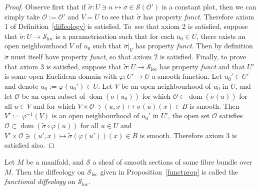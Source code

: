 \documentclass[10pt,a4paper]{amsart}
\numberwithin{equation}{section}
\def\loc{\operatorname{loc}}
\def\dom{\operatorname{dom}}
\def\OO{{\mathcal{O}}}
\def\SS{{\mathscr{S}}}
\begin{document}
\begin{proof}
Observe first that if $\tilde{\sigma}\colon U\ni u\mapsto \sigma\in \SS(\mathcal{O}')$ is a constant plot, then we can simply take $\OO:=\OO'$ and $V = U$ to see that $\tilde{\sigma}$ has property \textit{funct}. Therefore axiom 1 of Definition~\ref{diffeology} is satisfied. To~see that axiom 2 is satisfied, suppose that $\tilde{\sigma}\colon U\rightarrow\SS_{\loc}$ is a parametrisation such that for each $u_{0}\in U$, there exists an open neighbourhood $V$ of $u_{0}$ such that $\tilde{\sigma}|_{V}$ has property \textit{funct}. Then by definition $\tilde{\sigma}$ must itself have property \textit{funct}, so that axiom 2 is satisfied. Finally, to prove that axiom 3 is satisfied, suppose that $\tilde{\sigma}\colon U\rightarrow\SS_{\loc}$ has property \textit{funct} and that $U'$ is some open Euclidean domain with $\varphi\colon U'\rightarrow U$ a smooth function. Let $u_{0}'\in U'$ and denote $u_{0}:=\varphi(u_{0}')\in U$. Let $V$ be an open neighbourhood of $u_{0}$ in $U$, and let $\OO$ be an open subset of $\dom(\tilde{\sigma}(u_{0}))$ for which $\OO\subset\dom(\tilde{\sigma}(u))$ for all $u\in V$ and for which $V\times\OO\ni(u,x)\mapsto\tilde{\sigma}(u)(x)\in B$ is smooth. Then $V':=\varphi^{-1}(V)$ is an open neighbourhood of $u_{0}'$ in $U'$, the open set $\OO$ satisfies $\OO\subset\dom(\tilde{\sigma}\circ\varphi(u))$ for all $u\in U$ and $V'\times\OO\ni(u',x)\mapsto\tilde{\sigma}(\varphi(u'))(x)\in B$ is smooth. Therefore axiom 3 is satisfied also.
\end{proof}

\begin{Definition}\label{funl}
Let $M$ be a manifold, and $\SS$ a sheaf of smooth sections of some fibre bundle over $M$. Then the diffeology on $\SS_{\loc}$ given in Proposition~\ref{functprop} is called the \textit{functional diffeology} on $\SS_{\loc}$.
\end{Definition}
\end{document}
